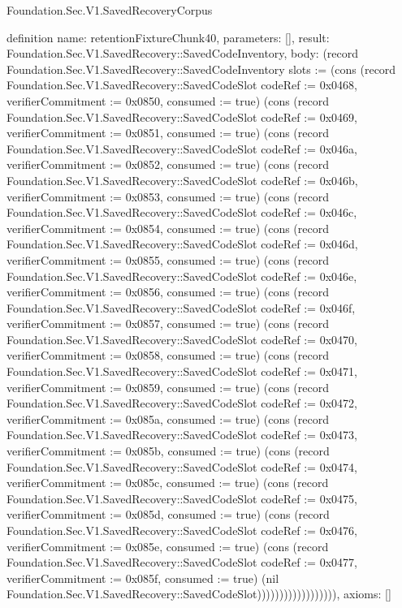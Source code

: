 \begin{lexlean}{Foundation.Sec.V1.SavedRecoveryCorpus}
\begin{semanticmodule}
definition{
  name: retentionFixtureChunk40,
  parameters: [],
  result: Foundation.Sec.V1.SavedRecovery::SavedCodeInventory,
  body: (record Foundation.Sec.V1.SavedRecovery::SavedCodeInventory {slots := (cons (record Foundation.Sec.V1.SavedRecovery::SavedCodeSlot {codeRef := 0x0468, verifierCommitment := 0x0850, consumed := true}) (cons (record Foundation.Sec.V1.SavedRecovery::SavedCodeSlot {codeRef := 0x0469, verifierCommitment := 0x0851, consumed := true}) (cons (record Foundation.Sec.V1.SavedRecovery::SavedCodeSlot {codeRef := 0x046a, verifierCommitment := 0x0852, consumed := true}) (cons (record Foundation.Sec.V1.SavedRecovery::SavedCodeSlot {codeRef := 0x046b, verifierCommitment := 0x0853, consumed := true}) (cons (record Foundation.Sec.V1.SavedRecovery::SavedCodeSlot {codeRef := 0x046c, verifierCommitment := 0x0854, consumed := true}) (cons (record Foundation.Sec.V1.SavedRecovery::SavedCodeSlot {codeRef := 0x046d, verifierCommitment := 0x0855, consumed := true}) (cons (record Foundation.Sec.V1.SavedRecovery::SavedCodeSlot {codeRef := 0x046e, verifierCommitment := 0x0856, consumed := true}) (cons (record Foundation.Sec.V1.SavedRecovery::SavedCodeSlot {codeRef := 0x046f, verifierCommitment := 0x0857, consumed := true}) (cons (record Foundation.Sec.V1.SavedRecovery::SavedCodeSlot {codeRef := 0x0470, verifierCommitment := 0x0858, consumed := true}) (cons (record Foundation.Sec.V1.SavedRecovery::SavedCodeSlot {codeRef := 0x0471, verifierCommitment := 0x0859, consumed := true}) (cons (record Foundation.Sec.V1.SavedRecovery::SavedCodeSlot {codeRef := 0x0472, verifierCommitment := 0x085a, consumed := true}) (cons (record Foundation.Sec.V1.SavedRecovery::SavedCodeSlot {codeRef := 0x0473, verifierCommitment := 0x085b, consumed := true}) (cons (record Foundation.Sec.V1.SavedRecovery::SavedCodeSlot {codeRef := 0x0474, verifierCommitment := 0x085c, consumed := true}) (cons (record Foundation.Sec.V1.SavedRecovery::SavedCodeSlot {codeRef := 0x0475, verifierCommitment := 0x085d, consumed := true}) (cons (record Foundation.Sec.V1.SavedRecovery::SavedCodeSlot {codeRef := 0x0476, verifierCommitment := 0x085e, consumed := true}) (cons (record Foundation.Sec.V1.SavedRecovery::SavedCodeSlot {codeRef := 0x0477, verifierCommitment := 0x085f, consumed := true}) (nil Foundation.Sec.V1.SavedRecovery::SavedCodeSlot)))))))))))))))))}),
  axioms: []
}


\end{semanticmodule}
\end{lexlean}
